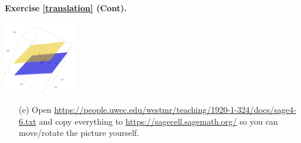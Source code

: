 \documentclass{beamer}
\newcommand{\fn}{\insertframenumber}
\theoremstyle{definition}
\newtheorem{exercise}{Exercise}
\begin{document}
\begin{frame}{\fn}
\begin{block}{\textbf{Exercise \ref{translation} (Cont).}}
	\begin{center}
		\includegraphics[width=1.25in]{../images/solution_set}
	\end{center}
	\begin{enumerate}[label=(\alph*)]
		\item[(e)] Open
		{ \tiny\url{https://people.uwec.edu/westmr/teaching/1920-1-324/docs/sage4-6.txt}}
		and copy everything to \url{https://sagecell.sagemath.org/} so you can move/rotate the picture yourself.
	\end{enumerate}
\end{block}
\end{frame}
\end{document}

